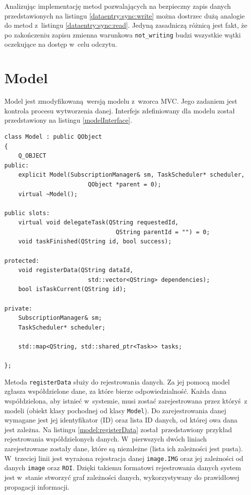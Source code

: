 Analizując implementację metod pozwalających na bezpieczny zapis danych przedstawionych na listingu \ref{dataentry:sync:write} można dostrzec dużą analogie do metod z~listingu \ref{dataentry:sync:read}. Jedyną zasadniczą różnicą jest fakt, że po zakończeniu zapisu zmienna warunkowa \lstinline$not_writing$ budzi wszystkie wątki oczekujące na dostęp w~celu odczytu.

\section{Model}

Model jest zmodyfikowaną wersją modelu z~wzorca MVC. Jego zadaniem jest kontrola procesu wytworzenia danej. Interfejs zdefiniowany dla modelu został przedstawiony na listingu \ref{modelInterface}.

\begin{minipage}{\textwidth}
	\begin{lstlisting}[label=modelInterface, caption={Interfejs klasy \lstinline$Model$},alsoletter={()[].=}]
class Model : public QObject
{
	Q_OBJECT
public:
	explicit Model(SubscriptionManager& sm, TaskScheduler* scheduler,
						QObject *parent = 0);
	virtual ~Model();

public slots:
	virtual void delegateTask(QString requestedId,
								QString parentId = "") = 0;
	void taskFinished(QString id, bool success);

protected:
	void registerData(QString dataId,
						std::vector<QString> dependencies);
	bool isTaskCurrent(QString id);

private:
	SubscriptionManager& sm;
	TaskScheduler* scheduler;
	
	std::map<QString, std::shared_ptr<Task>> tasks;

};
	\end{lstlisting}
\end{minipage}


Metoda \lstinline$registerData$ służy do rejestrowania danych. Za jej pomocą model zgłasza współdzielone dane, za które bierze odpowiedzialność. Każda dana współdzielona, aby istnieć w~systemie, musi zostać zarejestrowana przez któryś z modeli (obiekt klasy pochodnej od klasy \lstinline$Model$). Do zarejestrowania danej wymagane jest jej identyfikator (ID) oraz lista ID danych, od której owa dana jest zależna. Na listingu \ref{model:registerData} został przedstawiony przykład rejestrowania współdzielonych danych. W~pierwszych dwóch liniach zarejestrowane zostały dane, które są niezależne (lista ich zależności jest pusta). W~trzeciej linii jest wyrażona rejestracja danej \lstinline$image.IMG$ oraz jej zależności od danych \lstinline$image$ oraz \lstinline$ROI$. Dzięki takiemu formatowi rejestrowania danych system jest w~stanie stworzyć graf zależności danych, wykorzystywany do prawidłowej propagacji informacji.

